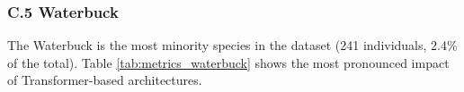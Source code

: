 \begin{table}[ht]
\centering
\caption{Performance metrics for the Warthog species (Phase 2).}
\label{tab:metrics_warthog}
\end{table}

\subsubsection*{C.5 Waterbuck}

The Waterbuck is the most minority species in the dataset (241 individuals, 2.4\% of the total). Table \ref{tab:metrics_waterbuck} shows the most pronounced impact of Transformer-based architectures.

